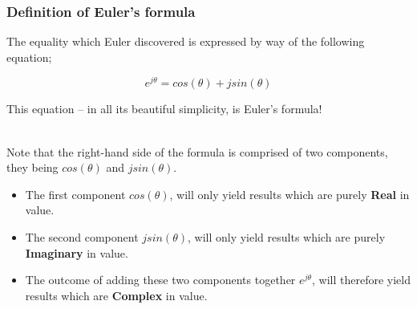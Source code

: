 \begin{frame}[t]

	\frametitle{Definition of Euler's formula}

	The equality which Euler discovered is expressed by way of the following equation;

	\begin{equation} \label{eqn_frame_1_a}
	e^{j\theta} = cos(\theta) + jsin(\theta)
	\end{equation}

	This equation -- in all its beautiful simplicity, is Euler's formula!\\~

	Note that the right-hand side of the formula is comprised of two components, they being \(cos(\theta)\) and \(jsin(\theta)\).

	\begin{itemize}
		\item   The first component \(cos(\theta)\), will only yield results which are purely \textbf{Real} in value.
		\item   The second component \(jsin(\theta)\), will only yield results which are purely \textbf{Imaginary} in value.
		\item   The outcome of adding these two components together \(e^{j\theta}\), will therefore yield results which are \textbf{Complex} in value.
	\end{itemize}

\end{frame}
